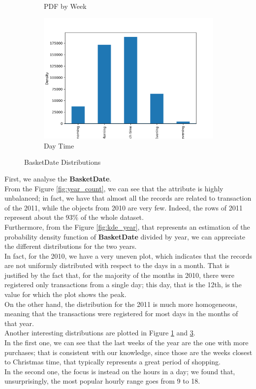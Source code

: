 \begin{figure}[!h]
\begin{subfigure}{.5\textwidth}
\caption{PDF by Week}
\label{fig:week_kde}
\end{subfigure}
\begin{subfigure}{.5\textwidth}
\centering
\includegraphics[width=.9\textwidth]{img/daytime_bar.png}
\caption{Day Time}
\label{fig:daytime_bar}
\end{subfigure}
\caption{BasketDate Distributions}
\end{figure}

First, we analyse the \textbf{BasketDate}.\\
From the Figure \ref{fig:year_count}, we can see that the attribute is highly unbalanced; in fact, we have that almost all the records are related to transaction of the 2011, while the objects from 2010 are very few.
Indeed, the rows of 2011 represent about the 93\% of the whole dataset.\\
Furthermore, from the Figure \ref{fig:kde_year}, that represents an estimation of the probability density function of \textbf{BasketDate} divided by year, we can appreciate the different distributions for the two years.\\
In fact, for the 2010, we have a very uneven plot, which indicates that the records are not uniformly distributed with respect to the days in a month. That is justified by the fact that, for the majority of the months in 2010, there were registered only transactions from a single day; this day, that is the 12th, is the value for which the plot shows the peak.\\
On the other hand, the distribution for the 2011 is much more homogeneous, meaning that the transactions were registered for most days in the months of that year.\\
Another interesting distributions are plotted in Figure \ref{fig:week_kde} and \ref{fig:daytime_bar}.\\
In the first one, we can see that the last weeks of the year are the one with more purchases; that is consistent with our knowledge, since those are the weeks closest to Christmas time, that typically represents a great period of shopping.\\	
In the second one, the focus is instead on the hours in a day; we found that, unsurprisingly, the most popular hourly range goes from 9 to 18.

